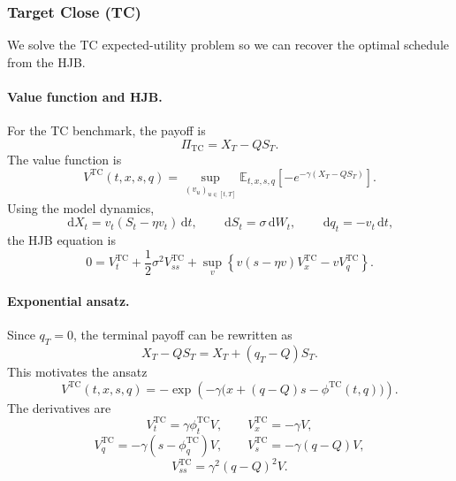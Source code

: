 \documentclass[12pt, a4paper]{article}
\newcommand{\E}{\mathbb{E}}
\newcommand{\dd}{\,\mathrm{d}}
\begin{document}
\subsubsection{Target Close (TC)}

We solve the TC expected-utility problem so we can recover the optimal schedule from the HJB.

\paragraph{Value function and HJB.}
For the TC benchmark, the payoff is
\[
  \Pi_{\mathrm{TC}} = X_T - QS_T.
\]
The value function is
\begin{equation}
  V^{\mathrm{TC}}(t,x,s,q)
  =
  \sup_{(v_u)_{u \in [t,T]}}
  \E_{t,x,s,q}\!\left[-e^{-\gamma(X_T - QS_T)}\right].
  \label{eq:V-TC-bonus}
\end{equation}
Using the model dynamics,
\[
  \dd X_t = v_t(S_t-\eta v_t)\dd t,
  \qquad
  \dd S_t = \sigma \dd W_t,
  \qquad
  \dd q_t = -v_t \dd t,
\]
the HJB equation is
\begin{equation}
  0
  =
  V_t^{\mathrm{TC}}
  +
  \frac{1}{2}\sigma^2 V_{ss}^{\mathrm{TC}}
  +
  \sup_v
  \left\{
    v(s-\eta v)V_x^{\mathrm{TC}} - vV_q^{\mathrm{TC}}
  \right\}.
  \label{eq:HJB-TC-bonus}
\end{equation}

\paragraph{Exponential ansatz.}
Since $q_T = 0$, the terminal payoff can be rewritten as
\[
  X_T - QS_T = X_T + (q_T - Q)S_T.
\]
This motivates the ansatz
\begin{equation}
  V^{\mathrm{TC}}(t,x,s,q)
  =
  -\exp\!\left(
    -\gamma\bigl(x+(q-Q)s-\phi^{\mathrm{TC}}(t,q)\bigr)
  \right).
  \label{eq:ansatz-TC-bonus}
\end{equation}
The derivatives are
\[
  V_t^{\mathrm{TC}} = \gamma \phi_t^{\mathrm{TC}} V,
  \qquad
  V_x^{\mathrm{TC}} = -\gamma V,
\]
\[
  V_q^{\mathrm{TC}} = -\gamma(s-\phi_q^{\mathrm{TC}})V,
  \qquad
  V_s^{\mathrm{TC}} = -\gamma(q-Q)V,
\]
\[
  V_{ss}^{\mathrm{TC}} = \gamma^2(q-Q)^2V.
\]
\end{document}
